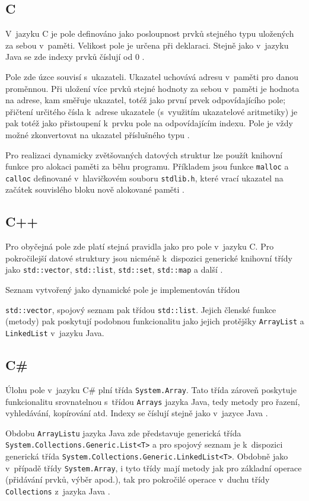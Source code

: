\documentclass[onepage, a4paper, 12pt]{bakalarka}
\begin{document}
\subsection{C}
V~jazyku C je pole definováno jako posloupnost prvků stejného typu uložených za sebou v~paměti. Velikost pole je určena při deklaraci. Stejně jako v~jazyku Java se zde indexy prvků číslují od 0 \cite{cpp-guide-array}.\par
Pole zde úzce souvisí s~ukazateli. Ukazatel uchovává adresu v~paměti pro danou proměnnou. Při uložení více prvků stejné hodnoty za sebou v~paměti je hodnota na adrese, kam směřuje ukazatel, totéž jako první prvek odpovídajícího pole; přičtení určitého čísla k~adrese ukazatele (s~využitím ukazatelové aritmetiky) je pak totéž jako přistoupení k~prvku pole na odpovídajícím indexu. Pole je vždy možné zkonvertovat na ukazatel příslušného typu \cite{cpp-guide-pointer}.\par
Pro realizaci dynamicky zvětšovaných datových struktur lze použít knihovní funkce pro alokaci paměti za běhu programu. Příkladem jsou funkce \texttt{malloc} a \texttt{calloc} definované v~hlavičkovém souboru \texttt{stdlib.h}, které vrací ukazatel na začátek souvislého bloku nově alokované paměti \cite{cpp-guide-malloc, cpp-guide-calloc}.

\subsection{C++}
Pro obyčejná pole zde platí stejná pravidla jako pro pole v~jazyku C. Pro pokročilejší datové struktury jsou nicméně k~dispozici generické knihovní třídy jako \texttt{std::vector}, \texttt{std::list}, \texttt{std::set}, \texttt{std::map} a další \cite{cpp-guide-vector, cpp-guide-list, cpp-guide-set, cpp-guide-map}.\par
Seznam vytvořený jako dynamické pole je implementován třídou \par\noindent\texttt{std::vector}, spojový seznam pak třídou \texttt{std::list}. Jejich členské funkce (metody) pak poskytují podobnou funkcionalitu jako jejich protějšky \texttt{ArrayList} a \texttt{LinkedList} v~jazyku Java.  \cite{cpp-guide-vector, cpp-guide-list}

\subsection{C\#}
Úlohu pole v~jazyku C\# plní třída \texttt{System.Array}. Tato třída zároveň poskytuje funkcionalitu srovnatelnou s~třídou \texttt{Arrays} jazyka Java, tedy metody pro řazení, vyhledávání, kopírování atd. Indexy se číslují stejně jako v~jazyce Java \cite{cs-guide-array-tutorial, cs-guide-array}.\par
Obdobu \texttt{ArrayListu} jazyka Java zde představuje generická třída \texttt{System.Collections.Generic.List<T>} a pro spojový seznam je k~dispozici generická třída \texttt{System.Collections.Generic.LinkedList<T>}. Obdobně jako v~případě třídy \texttt{System.Array}, i tyto třídy mají metody jak pro základní operace (přidávání prvků, výběr apod.), tak pro pokročilé operace v~duchu třídy \texttt{Collections} z~jazyka Java \cite{cs-guide-list, cs-guide-linkedlist}.
\end{document}
